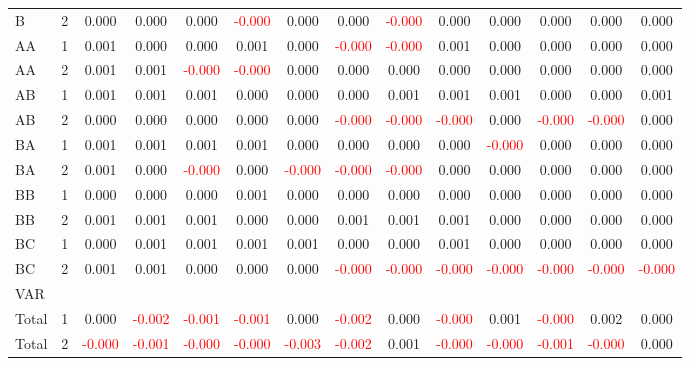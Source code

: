 \begin{table}[!htb]
{\begin{tabular}{llcccccccccccc}
B & 2 & 0.000 & 0.000 & 0.000 & \textcolor{red}{-0.000} & 0.000 & 0.000 & \textcolor{red}{-0.000} & 0.000 & 0.000 & 0.000 & 0.000 & 0.000\\
AA & 1 & 0.001 & 0.000 & 0.000 & 0.001 & 0.000 & \textcolor{red}{-0.000} & \textcolor{red}{-0.000} & 0.001 & 0.000 & 0.000 & 0.000 & 0.000\\
AA & 2 & 0.001 & 0.001 & \textcolor{red}{-0.000} & \textcolor{red}{-0.000} & 0.000 & 0.000 & 0.000 & 0.000 & 0.000 & 0.000 & 0.000 & 0.000\\
AB & 1 & 0.001 & 0.001 & 0.001 & 0.000 & 0.000 & 0.000 & 0.001 & 0.001 & 0.001 & 0.000 & 0.000 & 0.001\\
AB & 2 & 0.000 & 0.000 & 0.000 & 0.000 & 0.000 & \textcolor{red}{-0.000} & \textcolor{red}{-0.000} & \textcolor{red}{-0.000} & 0.000 & \textcolor{red}{-0.000} & \textcolor{red}{-0.000} & 0.000\\
BA & 1 & 0.001 & 0.001 & 0.001 & 0.001 & 0.000 & 0.000 & 0.000 & 0.000 & \textcolor{red}{-0.000} & 0.000 & 0.000 & 0.000\\
BA & 2 & 0.001 & 0.000 & \textcolor{red}{-0.000} & 0.000 & \textcolor{red}{-0.000} & \textcolor{red}{-0.000} & \textcolor{red}{-0.000} & 0.000 & 0.000 & 0.000 & 0.000 & 0.000\\
BB & 1 & 0.000 & 0.000 & 0.000 & 0.001 & 0.000 & 0.000 & 0.000 & 0.000 & 0.000 & 0.000 & 0.000 & 0.000\\
BB & 2 & 0.001 & 0.001 & 0.001 & 0.000 & 0.000 & 0.001 & 0.001 & 0.001 & 0.000 & 0.000 & 0.000 & 0.000\\
BC & 1 & 0.000 & 0.001 & 0.001 & 0.001 & 0.001 & 0.000 & 0.000 & 0.001 & 0.000 & 0.000 & 0.000 & 0.000\\
BC & 2 & 0.001 & 0.001 & 0.000 & 0.000 & 0.000 & \textcolor{red}{-0.000} & \textcolor{red}{-0.000} & \textcolor{red}{-0.000} & \textcolor{red}{-0.000} & \textcolor{red}{-0.000} & \textcolor{red}{-0.000} & \textcolor{red}{-0.000}\\
\hline
VAR &  &  &  &  &  &  &  &  &  &  &  &  & \\
\hline
Total & 1 & 0.000 & \textcolor{red}{-0.002} & \textcolor{red}{-0.001} & \textcolor{red}{-0.001} & 0.000 & \textcolor{red}{-0.002} & 0.000 & \textcolor{red}{-0.000} & 0.001 & \textcolor{red}{-0.000} & 0.002 & 0.000\\
Total & 2 & \textcolor{red}{-0.000} & \textcolor{red}{-0.001} & \textcolor{red}{-0.000} & \textcolor{red}{-0.000} & \textcolor{red}{-0.003} & \textcolor{red}{-0.002} & 0.001 & \textcolor{red}{-0.000} & \textcolor{red}{-0.000} & \textcolor{red}{-0.001} & \textcolor{red}{-0.000} & 0.000\\

\end{tabular}}
\end{table}
